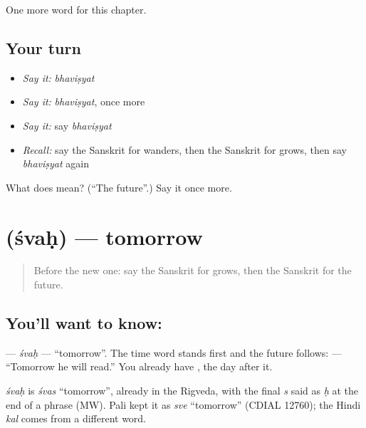 \begin{grammarlens}[title={What you've built}]
One more word for this chapter.
\end{grammarlens}

\subsection*{Your turn}
\begin{itemize}
\raggedright
  \item \emph{Say it:} \emph{bhaviṣyat}
  \item \emph{Say it:} \emph{bhaviṣyat}, once more
  \item \emph{Say it:} say \emph{bhaviṣyat}
  \item \emph{Recall:} say the Sanskrit for wanders, then the Sanskrit for grows, then say \emph{bhaviṣyat} again
\end{itemize}

\begin{tcolorbox}[breakable,colback=teal!4,colframe=teal!35!black,title={Before you move on}]
What does  mean? (\textquotedblleft{}The future\textquotedblright{}.) Say it once more.
\end{tcolorbox}
\section[\texorpdfstring{\sk{श्वः} (śvaḥ)}{श्वः (śvaḥ)}]{ (śvaḥ) — tomorrow}

\label{lesson:SA-C139-svah}



\begin{quote}
Before the new one: say the Sanskrit for grows, then the Sanskrit for the future.
\end{quote}

\subsection*{You'll want to know: }
\textbf{} — \emph{śvaḥ} — \textquotedblleft{}tomorrow\textquotedblright{}. The time word stands first and the future follows: \textbf{  } — \textquotedblleft{}Tomorrow he will read.\textquotedblright{} You already have \textbf{}, the day after it.

\begin{cousinweb}
\emph{śvaḥ} is \emph{śvas} \textquotedblleft{}tomorrow\textquotedblright{}, already in the Rigveda, with the final \emph{s} said as \emph{ḥ} at the end of a phrase (MW). Pali kept it as \emph{sve} \textquotedblleft{}tomorrow\textquotedblright{} (CDIAL 12760); the Hindi \emph{kal} comes from a different word.
\end{cousinweb}

